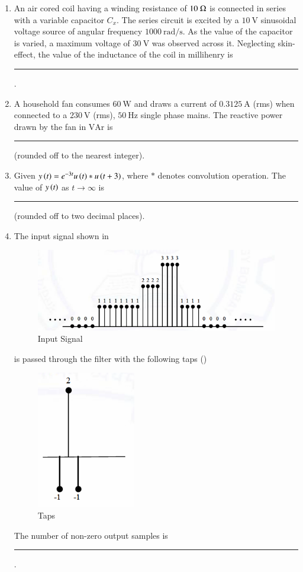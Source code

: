 \documentclass[journal,12pt,onecolumn]{IEEEtran}
\theoremstyle{remark}
\begin{document}
\begin{enumerate}
\item An air cored coil having a winding resistance of $10\ \ohm$ is connected in series with a variable capacitor $C_x$. The series circuit is excited by a $10\ \text{V}$ sinusoidal voltage source of angular frequency $1000\ \text{rad/s}$. As the value of the capacitor
is varied, a maximum voltage of $30\ \text{V}$ was observed across it. Neglecting skin-effect, the value of the inductance of the coil in millihenry is \rule{1.5cm}{0.4pt}. \par \hfill{}

\item A household fan consumes $60\ \text{W}$ and draws a current of $0.3125\ \text{A}$ (rms) when connected to a $230\ \text{V}$ (rms), $50\ \text{Hz}$ single phase mains. The reactive power drawn by the fan in $\text{VAr}$ is \rule{1.5cm}{0.4pt} (rounded off to the nearest integer). \par \hfill{}

\item Given $y\left(t\right) = e^{-3t}u\left(t\right) * u\left(t + 3\right)$, where $*$ denotes convolution operation. The value of $y\left(t\right)$ as $t \to \infty$ is \rule{1.5cm}{0.4pt} (rounded off to two decimal places). \par \hfill{}

\item The input signal shown in 
\begin{figure}[H]
    \centering
    \includegraphics[width=0.6\linewidth]{Figs/Q-44(fig-1).png}
    \caption{Input Signal}
    \label{fig:placeholder_44(1)}
\end{figure}is passed through the filter with the following taps ()
\begin{figure}[H]
    \centering
    \includegraphics[width=0.2\linewidth]{Figs/Q-44(fig-2).png}
    \caption{Taps}
    \label{fig:placeholder_44(2)}
\end{figure}  
The number of non-zero output samples is \rule{1.5cm}{0.4pt}. \par \hfill{}


\end{enumerate}
\end{document}
